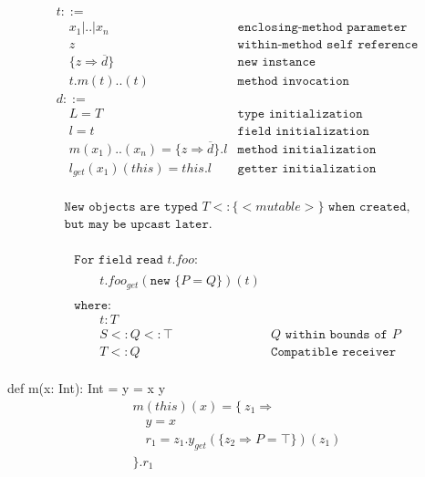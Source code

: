 \begin{equation*}
\begin{array}{ll}
t::=  & \\
\quad x_1|..|x_n & \texttt{enclosing-method parameter} \\
\quad z & \texttt{within-method self reference} \\
\quad \{ z \Rightarrow \overline{d} \} & \texttt{new instance} \\
\quad t.m(t)..(t) & \texttt{method invocation} \\
d::= & \\
\quad L=T & \texttt{type initialization} \\
\quad l=t & \texttt{field initialization} \\
\quad m(x_1)..(x_n)=\{ z \Rightarrow \overline{d} \}.l & \texttt{method initialization} \\
\quad l_{get}(x_1)(this)=this.l & \texttt{getter initialization} \\
\end{array}
\end{equation*}


\begin{equation*}
\begin{array}{l}
\texttt{New objects are typed
  $T <: \{<mutable>\}$ when created,} \\
\texttt{but may be upcast later.} \\
\end{array}
\end{equation*}


\begin{equation*}
\begin{array}{ll}
\texttt{For field read } t.foo: \\
\\
\qquad t.foo_{get}(\texttt{new } \{ P = Q\})(t) \\
\\
\texttt{where:} \\
\qquad t: T \\
\qquad S <: Q <: \top & \texttt{$Q$ within bounds of $P$} \\
\qquad T <: Q & \texttt{Compatible receiver} \\
\end{array}
\end{equation*}


def m(x: Int): Int = {
  y = x
  y
}
\begin{equation*}
\begin{array}{l}
m(this)(x) = \{\ z_1 \Rightarrow \\
\quad y = x \\
\quad r_1 = z_1.y_{get}(\{z_2 \Rightarrow P=\top\})(z_1) \\
\}.r_1 \\
\end{array}
\end{equation*}

